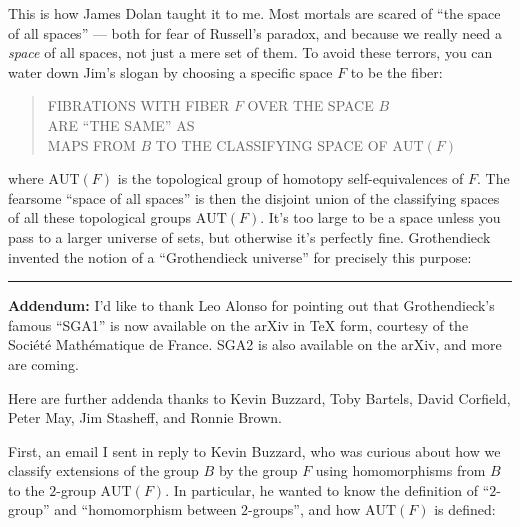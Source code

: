 \documentclass{article}
\def\tightlist{}
\renewcommand{\texttt}[1]{%
  \begingroup
  \ttfamily
  \begingroup\lccode`~=`/\lowercase{\endgroup\def~}{/\discretionary{}{}{}}%
  \begingroup\lccode`~=`[\lowercase{\endgroup\def~}{[\discretionary{}{}{}}%
  \begingroup\lccode`~=`.\lowercase{\endgroup\def~}{.\discretionary{}{}{}}%
  \catcode`/=\active\catcode`[=\active\catcode`.=\active
  \scantokens{#1\noexpand}%
  \endgroup
}
\begin{document}
This is how James Dolan taught it to me. Most mortals are scared of
``the space of all spaces'' --- both for fear of Russell's paradox, and
because we really need a \emph{space} of all spaces, not just a mere set
of them. To avoid these terrors, you can water down Jim's slogan by
choosing a specific space \(F\) to be the fiber:

\begin{quote}
FIBRATIONS WITH FIBER \(F\) OVER THE SPACE \(B\)\\
ARE ``THE SAME'' AS\\
MAPS FROM \(B\) TO THE CLASSIFYING SPACE OF \(\mathrm{AUT}(F)\)
\end{quote}

where \(\mathrm{AUT}(F)\) is the topological group of homotopy
self-equivalences of \(F\). The fearsome ``space of all spaces'' is then
the disjoint union of the classifying spaces of all these topological
groups \(\mathrm{AUT}(F)\). It's too large to be a space unless you pass
to a larger universe of sets, but otherwise it's perfectly fine.
Grothendieck invented the notion of a ``Grothendieck universe'' for
precisely this purpose:


\begin{center}\rule{0.5\linewidth}{0.5pt}\end{center}

\textbf{Addendum:} I'd like to thank Leo Alonso for pointing out that
Grothendieck's famous ``SGA1'' is now available on the arXiv in TeX
form, courtesy of the Société Mathématique de France. SGA2 is also
available on the arXiv, and more are coming.

Here are further addenda thanks to Kevin Buzzard, Toby Bartels, David
Corfield, Peter May, Jim Stasheff, and Ronnie Brown.

First, an email I sent in reply to Kevin Buzzard, who was curious about
how we classify extensions of the group \(B\) by the group \(F\) using
homomorphisms from \(B\) to the \(2\)-group \(\mathrm{AUT}(F)\). In
particular, he wanted to know the definition of ``\(2\)-group'' and
``homomorphism between \(2\)-groups'', and how \(\mathrm{AUT}(F)\) is
defined:
\end{document}
